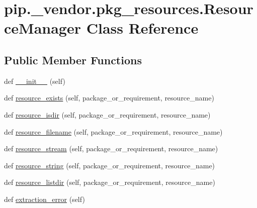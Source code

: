 \hypertarget{classpip_1_1__vendor_1_1pkg__resources_1_1ResourceManager}{}\section{pip.\+\_\+vendor.\+pkg\+\_\+resources.\+Resource\+Manager Class Reference}
\label{classpip_1_1__vendor_1_1pkg__resources_1_1ResourceManager}
\subsection*{Public Member Functions}
\begin{DoxyCompactItemize}
\item 
def \hyperlink{classpip_1_1__vendor_1_1pkg__resources_1_1ResourceManager_acf384dd97633547241555a3e98bf311c}{\+\_\+\+\_\+init\+\_\+\+\_\+} (self)
\item 
def \hyperlink{classpip_1_1__vendor_1_1pkg__resources_1_1ResourceManager_a0edef70f261beddedfed3048c174d2d9}{resource\+\_\+exists} (self, package\+\_\+or\+\_\+requirement, resource\+\_\+name)
\item 
def \hyperlink{classpip_1_1__vendor_1_1pkg__resources_1_1ResourceManager_af3010145687200a7d2b22aae92836651}{resource\+\_\+isdir} (self, package\+\_\+or\+\_\+requirement, resource\+\_\+name)
\item 
def \hyperlink{classpip_1_1__vendor_1_1pkg__resources_1_1ResourceManager_a16dfffb5fb76b3184308a510e566f962}{resource\+\_\+filename} (self, package\+\_\+or\+\_\+requirement, resource\+\_\+name)
\item 
def \hyperlink{classpip_1_1__vendor_1_1pkg__resources_1_1ResourceManager_a225168479d0545d24cf902c3fba55cfa}{resource\+\_\+stream} (self, package\+\_\+or\+\_\+requirement, resource\+\_\+name)
\item 
def \hyperlink{classpip_1_1__vendor_1_1pkg__resources_1_1ResourceManager_ad711bd17a1dd05ea0bd41f95815001c0}{resource\+\_\+string} (self, package\+\_\+or\+\_\+requirement, resource\+\_\+name)
\item 
def \hyperlink{classpip_1_1__vendor_1_1pkg__resources_1_1ResourceManager_a170a74c84cc8d52a97e28096fa10430a}{resource\+\_\+listdir} (self, package\+\_\+or\+\_\+requirement, resource\+\_\+name)
\item 
def \hyperlink{classpip_1_1__vendor_1_1pkg__resources_1_1ResourceManager_ac2eee188c89f4f2f3607dd89cd37b66e}{extraction\+\_\+error} (self)
\item 

\end{DoxyCompactItemize}
